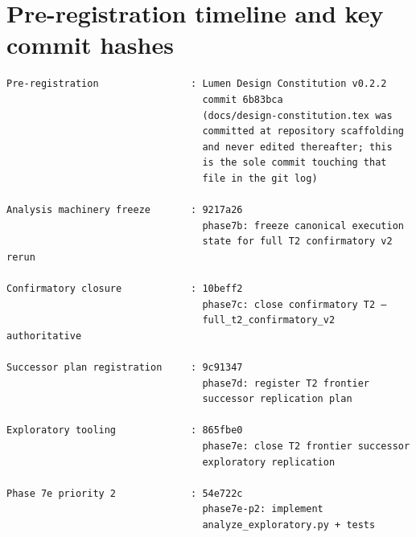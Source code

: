 
\section{Pre-registration timeline and key commit hashes}
\label{app:B}

\begin{verbatim}
Pre-registration                : Lumen Design Constitution v0.2.2
                                  commit 6b83bca
                                  (docs/design-constitution.tex was
                                  committed at repository scaffolding
                                  and never edited thereafter; this
                                  is the sole commit touching that
                                  file in the git log)

Analysis machinery freeze       : 9217a26
                                  phase7b: freeze canonical execution
                                  state for full T2 confirmatory v2 rerun

Confirmatory closure            : 10beff2
                                  phase7c: close confirmatory T2 —
                                  full_t2_confirmatory_v2 authoritative

Successor plan registration     : 9c91347
                                  phase7d: register T2 frontier
                                  successor replication plan

Exploratory tooling             : 865fbe0
                                  phase7e: close T2 frontier successor
                                  exploratory replication

Phase 7e priority 2             : 54e722c
                                  phase7e-p2: implement
                                  analyze_exploratory.py + tests
\end{verbatim}
